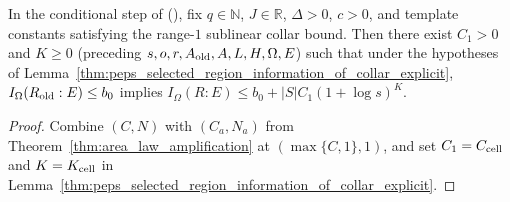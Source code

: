 \begin{lemma}
    \label{thm:peps_selected_region_information_of_collar}
    \leanok
    In the conditional step of
    \cite[Proposition~3.4]{OpenAI2026PolynomialPEPS} (\cite{gap:polypeps_angular_annular_geometry_scope}), fix $q\in\mathbb N$,
    $J\in\mathbb R$, $\Delta>0$, $c>0$, and template constants satisfying the range-$1$ sublinear collar bound.
    Then there exist $C_1>0$ and $K\ge0$ (preceding $s,o,r,A_{\rm old},A,L,H,\Omega,E$) such that under the hypotheses of Lemma~\ref{thm:peps_selected_region_information_of_collar_explicit}, $I_\Omega(R_{\rm old}:E)\le b_0$ implies
    $I_\Omega(R:E)\le b_0+|S|C_1(1+\log s)^K$.
\end{lemma}
\begin{proof}\leanok
    Combine $(C,N)$ with $(C_a,N_a)$ from Theorem~\ref{thm:area_law_amplification} at $(\max\{C,1\},1)$, and set $C_1=C_{\rm cell}$ and $K=K_{\rm cell}$ in
    Lemma~\ref{thm:peps_selected_region_information_of_collar_explicit}.
\end{proof}

